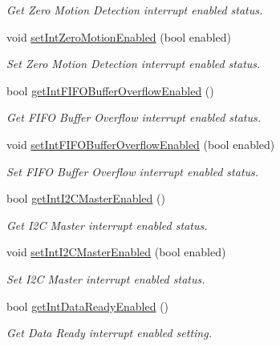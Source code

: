 \begin{DoxyCompactItemize}
\begin{DoxyCompactList}\small\item\em Get Zero Motion Detection interrupt enabled status. \end{DoxyCompactList}\item 
void \mbox{\hyperlink{classMPU6050_a5e36e3acace6e545718d7997169cff9b}{set\+Int\+Zero\+Motion\+Enabled}} (bool enabled)
\begin{DoxyCompactList}\small\item\em Set Zero Motion Detection interrupt enabled status. \end{DoxyCompactList}\item 
bool \mbox{\hyperlink{classMPU6050_a55f99c88cc84901f245924ed5e3fe47e}{get\+Int\+F\+I\+F\+O\+Buffer\+Overflow\+Enabled}} ()
\begin{DoxyCompactList}\small\item\em Get F\+I\+FO Buffer Overflow interrupt enabled status. \end{DoxyCompactList}\item 
void \mbox{\hyperlink{classMPU6050_a83710a6b1e07f3b385239cc06f275cdb}{set\+Int\+F\+I\+F\+O\+Buffer\+Overflow\+Enabled}} (bool enabled)
\begin{DoxyCompactList}\small\item\em Set F\+I\+FO Buffer Overflow interrupt enabled status. \end{DoxyCompactList}\item 
bool \mbox{\hyperlink{classMPU6050_a282ae29e029d88604a59c92bdf9ce252}{get\+Int\+I2\+C\+Master\+Enabled}} ()
\begin{DoxyCompactList}\small\item\em Get I2C Master interrupt enabled status. \end{DoxyCompactList}\item 
void \mbox{\hyperlink{classMPU6050_af238656844a3727fa96a8d434b55473e}{set\+Int\+I2\+C\+Master\+Enabled}} (bool enabled)
\begin{DoxyCompactList}\small\item\em Set I2C Master interrupt enabled status. \end{DoxyCompactList}\item 
bool \mbox{\hyperlink{classMPU6050_ae15f6043a74c9c9bf9754824802ce8d3}{get\+Int\+Data\+Ready\+Enabled}} ()
\begin{DoxyCompactList}\small\item\em Get Data Ready interrupt enabled setting. \end{DoxyCompactList}\item 

\end{DoxyCompactItemize}
